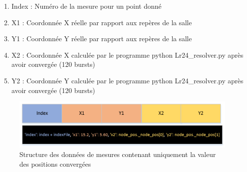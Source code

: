 \begin{enumerate}
 \item Index : Numéro de la mesure pour un point donné
 \item X1 : Coordonnée X réelle par rapport aux repères de la salle 
 \item Y1 : Coordonnée Y réelle par rapport aux repères de la salle 
 \item X2 : Coordonnée X calculée par le programme python Lr24\_resolver.py après avoir convergée (120 bursts)
 \item Y2 : Coordonnée Y calculée par le programme python Lr24\_resolver.py après avoir convergée (120 bursts)
\end{enumerate}

\begin{figure}[htp]
 \begin{center}
  \includegraphics[scale=0.7]{figures/dataStruct2.png}
  \caption{Structure des données de mesures contenant uniquement la valeur des positions convergées}
  \label{fig:dataStruct2} %
 \end{center}
\end{figure}










